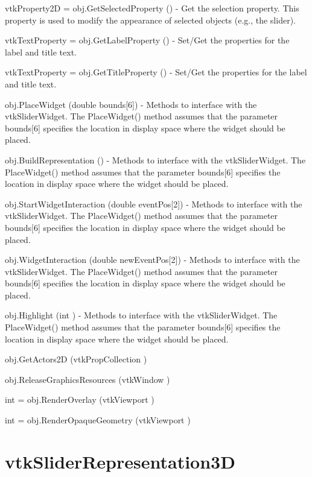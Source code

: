 \begin{DoxyItemize}
\item {\ttfamily vtk\-Property2\-D = obj.\-Get\-Selected\-Property ()} -\/ Get the selection property. This property is used to modify the appearance of selected objects (e.\-g., the slider).  
\item {\ttfamily vtk\-Text\-Property = obj.\-Get\-Label\-Property ()} -\/ Set/\-Get the properties for the label and title text.  
\item {\ttfamily vtk\-Text\-Property = obj.\-Get\-Title\-Property ()} -\/ Set/\-Get the properties for the label and title text.  
\item {\ttfamily obj.\-Place\-Widget (double bounds\mbox{[}6\mbox{]})} -\/ Methods to interface with the vtk\-Slider\-Widget. The Place\-Widget() method assumes that the parameter bounds\mbox{[}6\mbox{]} specifies the location in display space where the widget should be placed.  
\item {\ttfamily obj.\-Build\-Representation ()} -\/ Methods to interface with the vtk\-Slider\-Widget. The Place\-Widget() method assumes that the parameter bounds\mbox{[}6\mbox{]} specifies the location in display space where the widget should be placed.  
\item {\ttfamily obj.\-Start\-Widget\-Interaction (double event\-Pos\mbox{[}2\mbox{]})} -\/ Methods to interface with the vtk\-Slider\-Widget. The Place\-Widget() method assumes that the parameter bounds\mbox{[}6\mbox{]} specifies the location in display space where the widget should be placed.  
\item {\ttfamily obj.\-Widget\-Interaction (double new\-Event\-Pos\mbox{[}2\mbox{]})} -\/ Methods to interface with the vtk\-Slider\-Widget. The Place\-Widget() method assumes that the parameter bounds\mbox{[}6\mbox{]} specifies the location in display space where the widget should be placed.  
\item {\ttfamily obj.\-Highlight (int )} -\/ Methods to interface with the vtk\-Slider\-Widget. The Place\-Widget() method assumes that the parameter bounds\mbox{[}6\mbox{]} specifies the location in display space where the widget should be placed.  
\item {\ttfamily obj.\-Get\-Actors2\-D (vtk\-Prop\-Collection )}  
\item {\ttfamily obj.\-Release\-Graphics\-Resources (vtk\-Window )}  
\item {\ttfamily int = obj.\-Render\-Overlay (vtk\-Viewport )}  
\item {\ttfamily int = obj.\-Render\-Opaque\-Geometry (vtk\-Viewport )}  
\end{DoxyItemize}\hypertarget{vtkwidgets_vtksliderrepresentation3d}{}\section{vtk\-Slider\-Representation3\-D}\label{vtkwidgets_vtksliderrepresentation3d}

